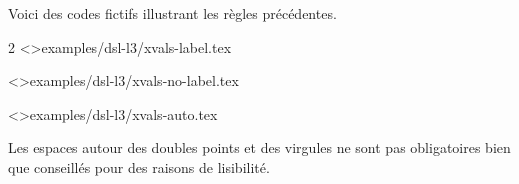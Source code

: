 \documentclass{tutodoc}
\begin{document}
Voici des codes fictifs illustrant les règles précédentes.
\begin{multicols}{2}
    \tdoclatexinput<>{examples/dsl-l3/xvals-label.tex}

    \tdoclatexinput<>{examples/dsl-l3/xvals-no-label.tex}

    \tdoclatexinput<>{examples/dsl-l3/xvals-auto.tex}
\end{multicols}




\begin{tdocnote}
    Les espaces autour des doubles points et des virgules ne sont pas obligatoires bien que conseillés pour des raisons de lisibilité.
\end{tdocnote}
\end{document}
